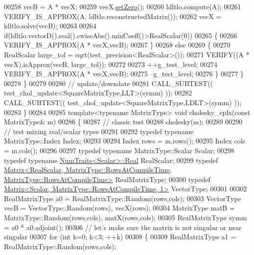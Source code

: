 \begin{DoxyCode}
00258       vecB = A * vecX;
00259       vecX.\hyperlink{class_eigen_1_1_plain_object_base_ac21ad5f989f320e46958b75ac8d9a1da}{setZero}();
00260       ldltlo.compute(A);
00261       VERIFY\_IS\_APPROX(A, ldltlo.reconstructedMatrix());
00262       vecX = ldltlo.solve(vecB);
00263 
00264       \textcolor{keywordflow}{if}(ldltlo.vectorD().real().cwiseAbs().minCoeff()>RealScalar(0))
00265       \{
00266         VERIFY\_IS\_APPROX(A * vecX,vecB);
00267       \}
00268       \textcolor{keywordflow}{else}
00269       \{
00270         RealScalar large\_tol =  sqrt(test\_precision<RealScalar>());
00271         VERIFY((A * vecX).isApprox(vecB, large\_tol));
00272 
00273         ++g\_test\_level;
00274         VERIFY\_IS\_APPROX(A * vecX,vecB);
00275         --g\_test\_level;
00276       \}
00277     \}
00278   \}
00279 
00280   \textcolor{comment}{// update/downdate}
00281   CALL\_SUBTEST(( test\_chol\_update<SquareMatrixType,LLT>(symm)  ));
00282   CALL\_SUBTEST(( test\_chol\_update<SquareMatrixType,LDLT>(symm) ));
00283 \}
00284 
00285 \textcolor{keyword}{template}<\textcolor{keyword}{typename} MatrixType> \textcolor{keywordtype}{void} cholesky\_cplx(\textcolor{keyword}{const} MatrixType& m)
00286 \{
00287   \textcolor{comment}{// classic test}
00288   cholesky(m);
00289 
00290   \textcolor{comment}{// test mixing real/scalar types}
00291 
00292   \textcolor{keyword}{typedef} \textcolor{keyword}{typename} MatrixType::Index Index;
00293 
00294   Index rows = m.rows();
00295   Index cols = m.cols();
00296 
00297   \textcolor{keyword}{typedef} \textcolor{keyword}{typename} MatrixType::Scalar Scalar;
00298   \textcolor{keyword}{typedef} \textcolor{keyword}{typename} \hyperlink{group___core___module_struct_eigen_1_1_num_traits}{NumTraits<Scalar>::Real} RealScalar;
00299   \textcolor{keyword}{typedef} 
      \hyperlink{group___core___module_class_eigen_1_1_matrix}{Matrix<RealScalar, MatrixType::RowsAtCompileTime, MatrixType::RowsAtCompileTime>}
       RealMatrixType;
00300   \textcolor{keyword}{typedef} \hyperlink{group___core___module_class_eigen_1_1_matrix}{Matrix<Scalar, MatrixType::RowsAtCompileTime, 1>} 
      VectorType;
00301 
00302   RealMatrixType a0 = RealMatrixType::Random(rows,cols);
00303   VectorType vecB = VectorType::Random(rows), vecX(rows);
00304   MatrixType matB = MatrixType::Random(rows,cols), matX(rows,cols);
00305   RealMatrixType symm =  a0 * a0.adjoint();
00306   \textcolor{comment}{// let's make sure the matrix is not singular or near singular}
00307   \textcolor{keywordflow}{for} (\textcolor{keywordtype}{int} k=0; k<3; ++k)
00308   \{
00309     RealMatrixType a1 = RealMatrixType::Random(rows,cols);

\end{DoxyCode}
